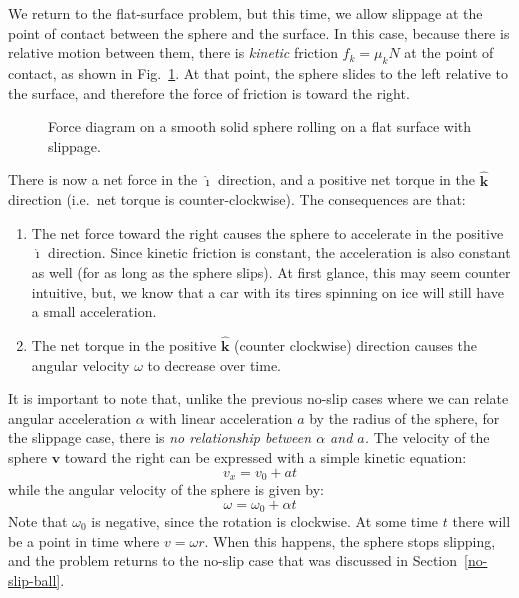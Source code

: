 \documentclass{../../../oss-handout}
\newcommand{\mb}[1]{\mathbf{#1}}
\newcommand{\iii}{\hat{\bm{\imath}}}
\newcommand{\kkk}{\hat{\bm{k}}}
\begin{document}
We return to the flat-surface problem, but this time, we allow slippage at the
point of contact between the sphere and the surface. In this case, because there
is relative motion between them, there is \emph{kinetic} friction $f_k=\mu_kN$
at the point of contact, as shown in Fig.~\ref{slip1}. At that point, the sphere
slides to the left relative to the surface, and therefore the force of friction
is toward the right.
\begin{figure}[!ht]
  \centering
  \caption{Force diagram on a smooth solid sphere rolling on a flat surface with
    slippage.}
  \label{slip1}
\end{figure}

There is now a net force in the $\iii$ direction, and a positive net torque in
the $\kkk$ direction (i.e.\ net torque is counter-clockwise). The consequences
are that:
\begin{enumerate}[topsep=0pt]
\item The net force toward the right causes the sphere to accelerate in the
  positive $\iii$ direction. Since kinetic friction is constant, the
  acceleration is also constant as well (for as long as the sphere slips). At
  first glance, this may seem counter intuitive, but, we know that a car with
  its tires spinning on ice will still have a small acceleration.
\item The net torque in the positive $\kkk$ (counter clockwise) direction
  causes the angular velocity $\omega$ to decrease over time.
\end{enumerate}
It is important to note that, unlike the previous no-slip cases where we can 
relate angular acceleration $\alpha$ with linear acceleration $a$ by the radius
of the sphere, for the slippage case, there is \emph{no relationship between
  $\alpha$ and $a$.} The velocity of the sphere $\mb{v}$ toward the right can
be expressed with a simple kinetic equation:
\begin{equation}
  v_x=v_0+at
\end{equation}
while the angular velocity of the sphere is given by:
\begin{equation}
  \omega=\omega_0+\alpha t
\end{equation}
Note that $\omega_0$ is negative, since the rotation is clockwise. At some time
$t$ there will be a point in time where $v=\omega r$. When this happens, the
sphere stops slipping, and the problem returns to the no-slip case that was
discussed in Section~\ref{no-slip-ball}.
\end{document}
